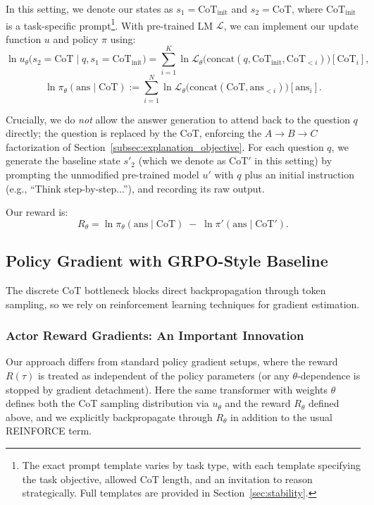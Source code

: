 \documentclass{article} %
\begin{document}
In this setting, we denote our states as $s_1 = \text{CoT}_{\text{init}}$ and $s_2 = \text{CoT}$, where $\text{CoT}_{\text{init}}$ is a task-specific prompt\footnote{The exact prompt template varies by task type, with each template specifying the task objective, allowed $\text{CoT}$ length, and an invitation to reason strategically. Full templates are provided in Section~\ref{sec:stability}.}. With pre-trained LM $\mathcal{L}$, we can implement our update function $u$ and policy $\pi$ using:
\[\ln u_\theta\!\bigl(s_2=\text{CoT}\mid q, s_1=\text{CoT}_{\text{init}}\bigr)
= \sum_{i=1}^{K} \ln \mathcal{L}_\theta\!\bigl(\text{concat}(q,\text{CoT}_{\text{init}},\text{CoT}_{<i})\bigr)[\text{CoT}_i], \]
\[\ln \pi_\theta(\text{ans}\mid \text{CoT})
:= \sum_{i=1}^{N} \ln \mathcal{L}_\theta\!\bigl(\text{concat}(\text{CoT},\text{ans}_{<i})\bigr)[\text{ans}_i].\]

Crucially, we do \emph{not} allow the answer generation to attend back to the question $q$ directly; the question is replaced by the $\text{CoT}$, enforcing the $A \to B \to C$ factorization of Section~\ref{subsec:explanation_objective}. For each question $q$, we generate the baseline state $s'_2$ (which we denote as $\text{CoT}'$ in this setting) by prompting the unmodified pre-trained model $u'$ with $q$ plus an initial instruction (e.g., ``Think step-by-step...''), and recording its raw output.

Our reward is:
\[
R_\theta = \ln \pi_\theta(\text{ans} \mid \text{CoT}) \;-\; \ln \pi'(\text{ans} \mid \text{CoT}').
\]

\subsection{Policy Gradient with GRPO-Style Baseline}
\label{subsec:grpo}

The discrete CoT bottleneck blocks direct backpropagation through token sampling, so we rely on reinforcement learning techniques for gradient estimation.

\subsubsection{Actor Reward Gradients: An Important Innovation}
Our approach differs from standard policy gradient setups, where the reward $R(\tau)$ is treated as independent of the policy parameters (or any $\theta$-dependence is stopped by gradient detachment). Here the same transformer with weights $\theta$ defines both the CoT sampling distribution via $u_\theta$ and the reward $R_\theta$ defined above, and we explicitly backpropagate through $R_\theta$ in addition to the usual REINFORCE term.
\end{document}
